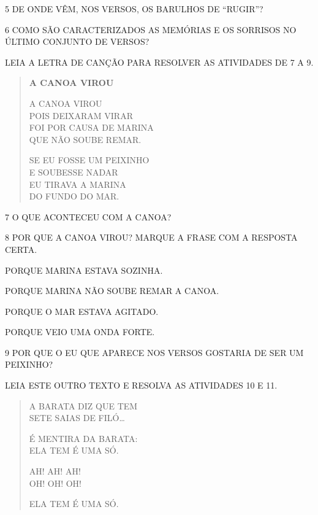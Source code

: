 \num{5} DE ONDE VÊM, NOS VERSOS, OS BARULHOS DE ``RUGIR''?


\num{6} COMO SÃO CARACTERIZADOS AS MEMÓRIAS E OS SORRISOS NO ÚLTIMO CONJUNTO DE VERSOS?


LEIA A LETRA DE CANÇÃO PARA RESOLVER AS ATIVIDADES DE 7 A 9.

\begin{myquote}
\begin{verse}
\textbf{A CANOA VIROU}

A CANOA VIROU\\
POIS DEIXARAM VIRAR\\
FOI POR CAUSA DE MARINA\\
QUE NÃO SOUBE REMAR.

SE EU FOSSE UM PEIXINHO\\
E SOUBESSE NADAR\\
EU TIRAVA A MARINA\\
DO FUNDO DO MAR.
\end{verse}

\end{myquote}

\num{7} O QUE ACONTECEU COM A CANOA?



\num{8} POR QUE A CANOA VIROU? MARQUE A FRASE COM A RESPOSTA CERTA.

\begin{boxlist}[itemsep=0pt]
 PORQUE MARINA ESTAVA SOZINHA.

 PORQUE MARINA NÃO SOUBE REMAR A CANOA.

 PORQUE O MAR ESTAVA AGITADO.

 PORQUE VEIO UMA ONDA FORTE.
\end{boxlist}

\num{9} POR QUE O EU QUE APARECE NOS VERSOS GOSTARIA DE SER UM PEIXINHO?


LEIA ESTE OUTRO TEXTO E RESOLVA AS ATIVIDADES 10 E 11.

\begin{myquote}
\begin{verse}
A BARATA DIZ QUE TEM\\
SETE SAIAS DE FILÓ\ldots{}

É MENTIRA DA BARATA:\\
ELA TEM É UMA SÓ.

AH! AH! AH!\\
OH! OH! OH!

ELA TEM É UMA SÓ.
\end{verse}

\end{myquote}

